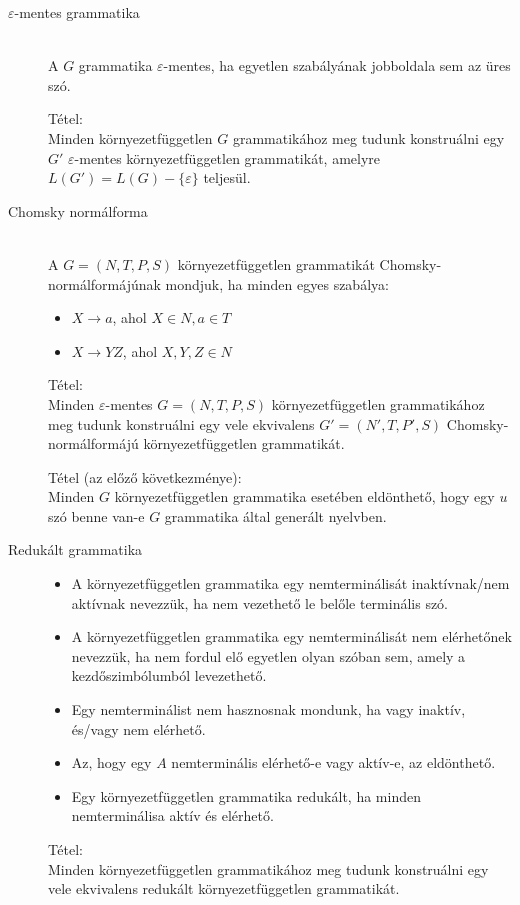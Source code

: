 \documentclass[margin=0px]{article}
\begin{document}
			\begin{description}
				\item[$\varepsilon$-mentes grammatika] \hfill \\
					A $G$ grammatika $\varepsilon$-mentes, ha egyetlen szabályának jobboldala sem az üres szó.
					
					Tétel:\\
					Minden környezetfüggetlen $G$ grammatikához meg tudunk konstruálni egy $G'$ $\varepsilon$-mentes környezetfüggetlen grammatikát, amelyre $L(G') = L(G) - \{\varepsilon\}$ teljesül.
				 \item[Chomsky normálforma] \hfill \\
					A $G = (N, T, P, S)$ környezetfüggetlen grammatikát Chomsky-normálformájúnak mondjuk, ha minden egyes szabálya:
					\begin{itemize}
						\item $X \rightarrow a$, ahol $X \in N, a \in T$
						\item $X \rightarrow YZ$, ahol $X,Y,Z \in N$
					\end{itemize}
					Tétel:\\
					Minden $\varepsilon$-mentes $G=(N,T,P,S)$ környezetfüggetlen grammatikához meg tudunk konstruálni egy vele ekvivalens $G' = (N', T, P', S)$ Chomsky-normálformájú környezetfüggetlen grammatikát.
					
					Tétel (az előző következménye):\\
					Minden $G$ környezetfüggetlen grammatika esetében eldönthető, hogy egy $u$ szó benne van-e $G$ grammatika által generált nyelvben.
				\item[Redukált grammatika] \hfill
					\begin{itemize}
						\item A környezetfüggetlen grammatika egy nemterminálisát inaktívnak/nem aktívnak nevezzük, ha nem vezethető le belőle terminális szó.
						\item A környezetfüggetlen grammatika egy nemterminálisát nem elérhetőnek nevezzük, ha nem fordul elő egyetlen olyan szóban sem, amely a kezdőszimbólumból levezethető.
						\item Egy nemterminálist nem hasznosnak mondunk, ha vagy inaktív, és/vagy nem elérhető.
						\item Az, hogy egy $A$ nemterminális elérhető-e vagy aktív-e, az eldönthető.
						\item Egy környezetfüggetlen grammatika redukált, ha minden nemterminálisa aktív és elérhető.
					\end{itemize}
					Tétel:\\
					Minden környezetfüggetlen grammatikához meg tudunk konstruálni egy vele ekvivalens redukált környezetfüggetlen grammatikát.
					
			\end{description}
\end{document}
